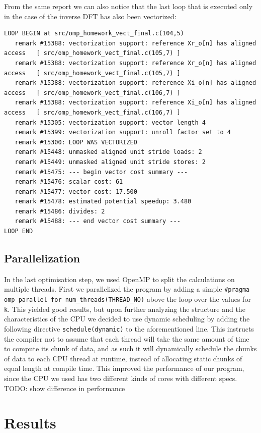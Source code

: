 \documentclass{article}
\begin{document}
From the same report we can also notice that the last loop that is executed only in the case of the inverse DFT has also been vectorized:
\begin{verbatim}
LOOP BEGIN at src/omp_homework_vect_final.c(104,5)
   remark #15388: vectorization support: reference Xr_o[n] has aligned access   [ src/omp_homework_vect_final.c(105,7) ]
   remark #15388: vectorization support: reference Xr_o[n] has aligned access   [ src/omp_homework_vect_final.c(105,7) ]
   remark #15388: vectorization support: reference Xi_o[n] has aligned access   [ src/omp_homework_vect_final.c(106,7) ]
   remark #15388: vectorization support: reference Xi_o[n] has aligned access   [ src/omp_homework_vect_final.c(106,7) ]
   remark #15305: vectorization support: vector length 4
   remark #15399: vectorization support: unroll factor set to 4
   remark #15300: LOOP WAS VECTORIZED
   remark #15448: unmasked aligned unit stride loads: 2 
   remark #15449: unmasked aligned unit stride stores: 2 
   remark #15475: --- begin vector cost summary ---
   remark #15476: scalar cost: 61 
   remark #15477: vector cost: 17.500 
   remark #15478: estimated potential speedup: 3.480 
   remark #15486: divides: 2 
   remark #15488: --- end vector cost summary ---
LOOP END
\end{verbatim}

\subsection{Parallelization}
In the last optimisation step, we used OpenMP to split the calculations on multiple threads. First we parallelized the program by adding a simple \verb|#pragma omp parallel for num_threads(THREAD_NO)| above the loop over the values for \verb|k|. This yielded good results, but upon further analyzing the structure and the characteristics of the CPU we decided to use dynamic scheduling by adding the following directive \verb|schedule(dynamic)| to the aforementioned line. This instructs the compiler not to assume that each thread will take the same amount of time to compute its chunk of data, and as such it will dynamically schedule the chunks of data to each CPU thread at runtime, instead of allocating static chunks of equal length at compile time. This improved the performance of our program, since the CPU we used has two different kinds of cores with different specs. TODO: show difference in performance 

\section{Results}
\end{document}
